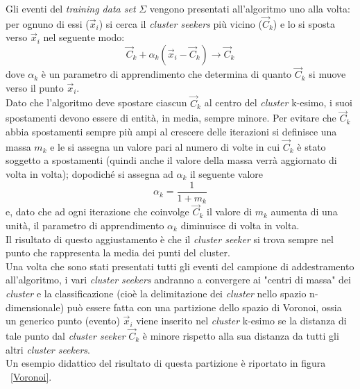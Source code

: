 Gli eventi del \textit{training data set} $\Sigma$ vengono presentati all'algoritmo uno alla volta: per ognuno di essi ($\vec{x}_i$) si cerca il \textit{cluster seekers} più vicino ($\vec{C}_k$) e lo si sposta verso $\vec{x}_i$ nel seguente modo:
\begin{equation}
\vec{C}_k + \alpha_k(\vec{x}_i - \vec{C}_k) \rightarrow \vec{C}_k
\end{equation}
dove $\alpha_k$ è un parametro di apprendimento che determina di quanto $\vec{C}_k$ si muove verso il punto $\vec{x}_i$. \\
Dato che l'algoritmo deve spostare ciascun $\vec{C}_k$ al centro del \textit{cluster} k-esimo, i suoi spostamenti devono essere di entità, in media, sempre minore. Per evitare che $\vec{C}_k$ abbia spostamenti sempre più ampi al crescere delle iterazioni si definisce una massa $m_k$ e le si assegna un valore pari al numero di volte in cui $\vec{C}_k$ è stato soggetto a spostamenti (quindi anche il valore della massa verrà aggiornato di volta in volta); dopodiché si assegna ad $\alpha_k$ il seguente valore
\begin{equation}
\alpha_k = \frac{1}{1 + m_k}
\end{equation} 
e, dato che ad ogni iterazione che coinvolge $\vec{C}_k$ il valore di $m_k$ aumenta di una unità, il parametro di apprendimento $\alpha_k$ diminuisce di volta in volta. \\
Il risultato di questo aggiustamento è che il \textit{cluster seeker} si trova sempre nel punto che rappresenta la media dei punti del cluster. \\
Una volta che sono stati presentati tutti gli eventi del campione di addestramento all'algoritmo, i vari \textit{cluster seekers} andranno a convergere ai "centri di massa" dei \textit{cluster} e la classificazione (cioè la delimitazione dei \textit{cluster} nello spazio n-dimensionale) può essere fatta con una partizione dello spazio di Voronoi, ossia un generico punto (evento) $\vec{x}_i$ viene inserito nel \textit{cluster} k-esimo se la distanza di tale punto dal \textit{cluster seeker} $\vec{C}_k$ è minore rispetto alla sua distanza da tutti gli altri \textit{cluster seekers}. \\
Un esempio didattico del risultato di questa partizione è riportato in figura ~\ref{Voronoi}.

\newpage

